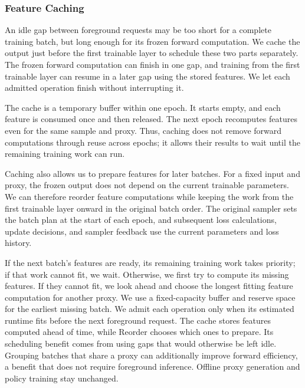 \begingroup
\color{blue}
\subsubsection{Feature Caching}
\label{subsec:feature-prefetch}

An idle gap between foreground requests may be too short for a complete training batch, but long enough for its frozen forward computation.
We cache the output just before the first trainable layer to schedule these two parts separately.
The frozen forward computation can finish in one gap, and training from the first trainable layer can resume in a later gap using the stored features.
We let each admitted operation finish without interrupting it.

The cache is a temporary buffer within one epoch.
It starts empty, and each feature is consumed once and then released.
The next epoch recomputes features even for the same sample and proxy.
Thus, caching does not remove forward computations through reuse across epochs; it allows their results to wait until the remaining training work can run.

Caching also allows us to prepare features for later batches.
For a fixed input and proxy, the frozen output does not depend on the current trainable parameters.
We can therefore reorder feature computations while keeping the work from the first trainable layer onward in the original batch order.
The original sampler sets the batch plan at the start of each epoch, and subsequent loss calculations, update decisions, and sampler feedback use the current parameters and loss history.

If the next batch's features are ready, its remaining training work takes priority; if that work cannot fit, we wait.
Otherwise, we first try to compute its missing features.
If they cannot fit, we look ahead and choose the longest fitting feature computation for another proxy.
We use a fixed-capacity buffer and reserve space for the earliest missing batch.
We admit each operation only when its estimated runtime fits before the next foreground request.
The cache stores features computed ahead of time, while Reorder chooses which ones to prepare.
Its scheduling benefit comes from using gaps that would otherwise be left idle.
Grouping batches that share a proxy can additionally improve forward efficiency, a benefit that does not require foreground inference.
Offline proxy generation and policy training stay unchanged.

\par
\endgroup
